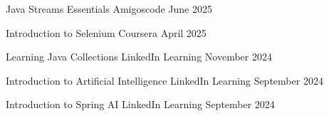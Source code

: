 \vspace{-1em} %

\begin{cvhonors}

  \cvhonor
    {Java Streams Essentials}
    {Amigoscode}
    {}
    {June 2025}

  \cvhonor
    {Introduction to Selenium}
    {Coursera}
    {}
    {April 2025}

  \cvhonor
    {Learning Java Collections}
    {LinkedIn Learning}
    {}
    {November 2024}

  \cvhonor
    {Introduction to Artificial Intelligence}
    {LinkedIn Learning}
    {}
    {September 2024}

  \cvhonor
    {Introduction to Spring AI}
    {LinkedIn Learning}
    {}
    {September 2024}

\end{cvhonors}
